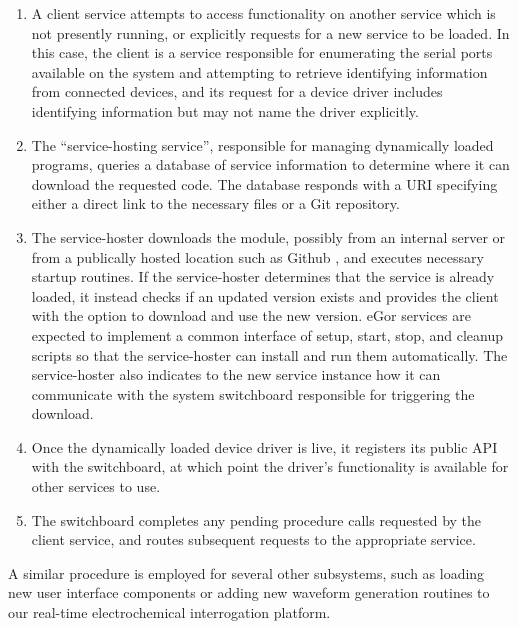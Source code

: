 \documentclass[../thesis]{subfiles}
\begin{document}
\begin{enumerate}
  \item{
      A client service attempts to access functionality on another
      service which is not presently running, or explicitly requests for
      a new service to be loaded. In this case, the client is a service
      responsible for enumerating the serial ports available on the
      system and attempting to retrieve identifying information from
      connected devices, and its request for a device driver includes
      identifying information but may not name the driver explicitly.
  }
  \item{
      The ``service-hosting service'', responsible for managing
      dynamically loaded programs, queries a database of service
      information to determine where it can download the requested
      code. The database responds with a \gls{URI} specifying either a
      direct link to the necessary files or a Git repository.
  }
  \item{
      The service-hoster downloads the module, possibly from an
      internal server or from a publically hosted location such as
      Github \cite{Github}, and executes necessary startup
      routines. If the service-hoster determines that the service is
      already loaded, it instead checks if an updated version exists
      and provides the client with the option to download and use the
      new version. eGor services are expected to implement a common
      interface of setup, start, stop, and cleanup scripts so that the
      service-hoster can install and run them automatically. The
      service-hoster also indicates to the new service instance how it
      can communicate with the system switchboard responsible for
      triggering the download.
  }
  \item{
      Once the dynamically loaded device driver is live, it registers its
      public \gls{API} with the switchboard, at which point the
      driver's functionality is available for other services to use.
  }
  \item{
      The switchboard completes any pending procedure calls requested
      by the client service, and routes subsequent requests to the
      appropriate service.
  }
\end{enumerate}

A similar procedure is employed for several other
subsystems, such as loading new user interface components or adding
new waveform generation routines to our real-time electrochemical
interrogation platform.
\end{document}
